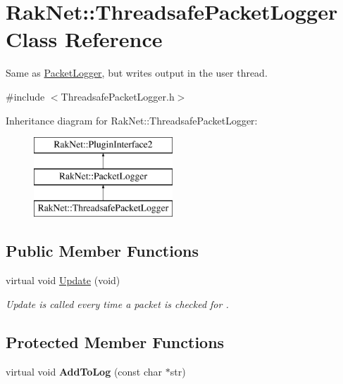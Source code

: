 \hypertarget{class_rak_net_1_1_threadsafe_packet_logger}{\section{Rak\-Net\-:\-:Threadsafe\-Packet\-Logger Class Reference}
\label{class_rak_net_1_1_threadsafe_packet_logger}
}


Same as \hyperlink{class_rak_net_1_1_packet_logger}{Packet\-Logger}, but writes output in the user thread.  




{\ttfamily \#include $<$Threadsafe\-Packet\-Logger.\-h$>$}

Inheritance diagram for Rak\-Net\-:\-:Threadsafe\-Packet\-Logger\-:\begin{figure}[H]
\begin{center}
\leavevmode
\includegraphics[height=3.000000cm]{class_rak_net_1_1_threadsafe_packet_logger}
\end{center}
\end{figure}
\subsection*{Public Member Functions}
\begin{DoxyCompactItemize}
\item 
\hypertarget{class_rak_net_1_1_threadsafe_packet_logger_a0316843d33ab7bf8a6ff403ded5b7f68}{virtual void \hyperlink{class_rak_net_1_1_threadsafe_packet_logger_a0316843d33ab7bf8a6ff403ded5b7f68}{Update} (void)}\label{class_rak_net_1_1_threadsafe_packet_logger_a0316843d33ab7bf8a6ff403ded5b7f68}

\begin{DoxyCompactList}\small\item\em Update is called every time a packet is checked for . \end{DoxyCompactList}\end{DoxyCompactItemize}
\subsection*{Protected Member Functions}
\begin{DoxyCompactItemize}
\item 
\hypertarget{class_rak_net_1_1_threadsafe_packet_logger_a387d80949a5cd28d9fcc7539ba0dde33}{virtual void {\bfseries Add\-To\-Log} (const char $\ast$str)}\label{class_rak_net_1_1_threadsafe_packet_logger_a387d80949a5cd28d9fcc7539ba0dde33}

\end{DoxyCompactItemize}
